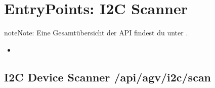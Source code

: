 \documentclass[letterpaper,10pt,english]{sphinxmanual}
\begin{document}
\sphinxstepscope


\chapter{Entry\sphinxhyphen{}Points: I2C Scanner}
\label{\detokenize{agv_rest_api_i2c:entry-points-i2c-scanner}}\label{\detokenize{agv_rest_api_i2c::doc}}
\begin{sphinxadmonition}{note}{Note:}
\sphinxAtStartPar
Eine Gesamtübersicht der API findest du unter {\hyperref[\detokenize{index::doc}]{}}.
\end{sphinxadmonition}

\sphinxAtStartPar
{}
\begin{itemize}
\item {} 
\sphinxAtStartPar
{\hyperref[\detokenize{agv_rest_api_i2c:get-api-agv-i2c-scan}]{}}

\end{itemize}


\section{I2C Device Scanner \sphinxhyphen{} /api/agv/i2c/scan}
\label{\detokenize{agv_rest_api_i2c:i2c-device-scanner-api-agv-i2c-scan}}\label{\detokenize{agv_rest_api_i2c:get-api-agv-i2c-scan}}
\end{document}
